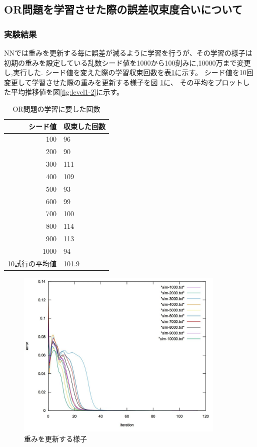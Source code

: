 \subsection{OR問題を学習させた際の誤差収束度合いについて}
\subsubsection{実験結果}
NNでは重みを更新する毎に誤差が減るように学習を行うが、その学習の様子は初期の重みを設定している乱数シード値を1000から100刻みに,10000万まで変更し,実行した.
シード値を変えた際の学習収束回数を表\ref{table:level1}に示す。
シード値を10回変更して学習させた際の重みを更新する様子を図
\ref{fig:level1-1}に、
その平均をプロットした平均推移値を図\ref{fig:level1-2}に示す。


\begin{table}[htb]
 \begin{center}
  \caption{OR問題の学習に要した回数}
  \label{table:level1}
  \begin{tabular}[htb]{r|l} \hline
   シード値 & 収束した回数 \\ \hline \hline
   100 & 96 \\ \hline
   200 & 90 \\ \hline
   300 & 111 \\ \hline
   400 & 109 \\ \hline
   500 & 93 \\ \hline
   600 & 99 \\ \hline
   700 & 100 \\ \hline
   800 & 114 \\ \hline
   900 & 113 \\ \hline
   1000 & 94 \\ \hline \hline
   10試行の平均値 & 101.9 \\ \hline
  \end{tabular}
 \end{center}
\end{table}




\begin{figure}[h]
 \begin{center}
  \includegraphics[width=10.0cm]{figs/level1/seeds.pdf}
  \caption{重みを更新する様子}
  \label{fig:level1-1}
 \end{center}
\end{figure}

